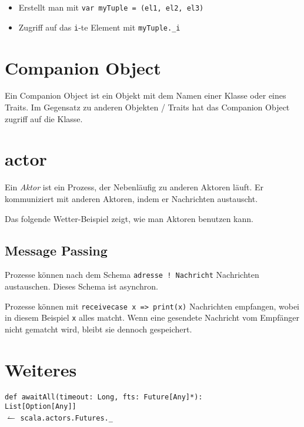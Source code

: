 \begin{itemize}
    \item Erstellt man mit \verb+var myTuple = (el1, el2, el3)+
    \item Zugriff auf das \verb+i+-te Element mit \verb+myTuple._i+
\end{itemize}

\section{Companion Object}
Ein Companion Object ist ein Objekt mit dem Namen einer Klasse oder eines Traits.
Im Gegensatz zu anderen Objekten / Traits hat das Companion Object zugriff auf
die Klasse.

\section{actor}
\begin{definition}[Aktor]
    Ein \textit{Aktor} ist ein Prozess, der Nebenläufig zu anderen Aktoren
    läuft. Er kommuniziert mit anderen Aktoren, indem er Nachrichten austauscht.
\end{definition}

Das folgende Wetter-Beispiel zeigt, wie man Aktoren benutzen kann.

\subsection{Message Passing}%
Prozesse können nach dem Schema \texttt{adresse ! Nachricht} Nachrichten austauschen.
Dieses Schema ist asynchron.

Prozesse können mit \texttt{receive{case x => print(x)}} Nachrichten empfangen,
wobei in diesem Beispiel \texttt{x} alles matcht. Wenn eine gesendete Nachricht
vom Empfänger nicht gematcht wird, bleibt sie dennoch gespeichert.

\section{Weiteres}
\texttt{def awaitAll(timeout: Long, fts: Future[Any]*):}\\
\-\hspace{1.8cm}\texttt{List[Option[Any]]}\\
\-\hspace{0.8cm}$\leftharpoonup$ \texttt{scala.actors.Futures.\_}

